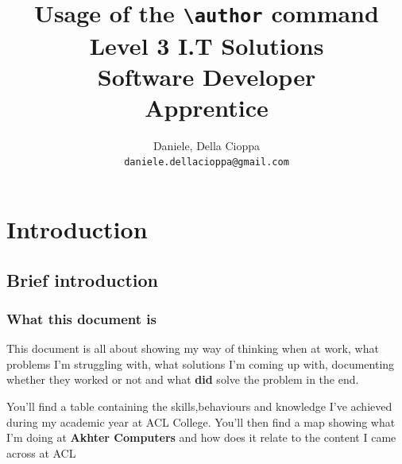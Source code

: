 \documentclass[a4paper,12pt]{book}
\author{
  Daniele, Della Cioppa\\
  \texttt{daniele.dellacioppa@gmail.com}
}
\title{Usage of the \texttt{\textbackslash author} command}
\begin{document}
\title{%
Level 3 I.T Solutions\\
\large  Software Developer\\
\small Apprentice}
\maketitle
\hypersetup{linkcolor=teal}
\tableofcontents
\hypersetup{linkcolor=blue}
\clearpage



\tableofcontents
\clearpage

\part{Introduction}

\chapter{Brief introduction}


%

\bigskip
\bigskip
\bigskip
\bigskip
\section{What this document is}

This document is all about showing my way of thinking when at work, what problems I'm struggling with, what solutions I'm coming up with, documenting whether they worked or not and what \textbf{did} solve the problem in the end.

You'll find a table containing the skills,behaviours and knowledge I've achieved during my academic year at ACL College. You'll then find a map showing what I'm doing at \textbf{Akhter Computers} and how does it relate to the content I came across at ACL 

\end{document}
